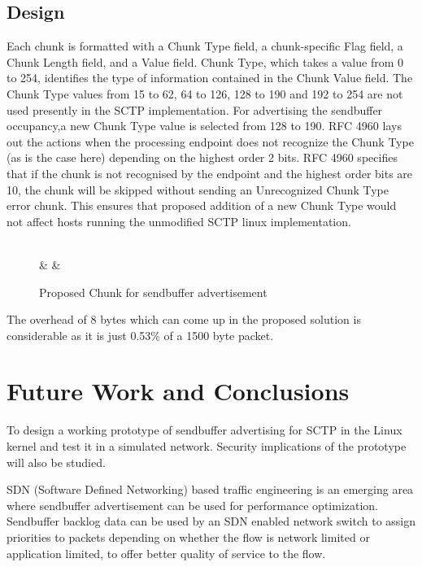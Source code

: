 \documentclass[a4paper,11pt]{article}
\begin{document}
\subsection{Design}
Each chunk is formatted with a Chunk Type field, a chunk-specific Flag field,
a Chunk Length field, and a Value field. Chunk Type, which takes a value
from 0 to 254, identifies the type of information contained in the Chunk
Value field. The Chunk Type values from 15 to 62, 64 to 126, 128 to 190 and
192 to 254 are not used presently in the SCTP implementation.
For advertising the sendbuffer occupancy,a new Chunk Type value is selected
from 128 to 190. RFC 4960 \cite{rfc4960} lays out the actions when
the processing endpoint does not recognize the Chunk Type (as is
the case here) depending on the highest order 2 bits. RFC 4960 \cite{rfc4960}
specifies that if the chunk is not recognised by the endpoint and the
highest order bits are 10, the chunk will be skipped without sending
an Unrecognized Chunk Type error chunk. This ensures that proposed
addition of a new Chunk Type would not affect hosts running the
unmodified SCTP linux implementation.

\begin{figure}[h]
	\centering
	\begin{bytefield}[bitwidth=1.1em]{32}
	\\
	 &  & \\
	\end{bytefield}
	\caption{Proposed Chunk for sendbuffer advertisement}
\end{figure}

The overhead of 8 bytes which can come up in the proposed solution
is considerable as it is just 0.53\% of a 1500 byte packet.


\section{Future Work and Conclusions}
To design a working prototype of sendbuffer advertising for SCTP in the Linux
kernel and test it in a simulated network. Security implications of the
prototype will also be studied.


SDN (Software Defined Networking) based traffic engineering
is an emerging area where
sendbuffer advertisement can be used for
performance optimization. Sendbuffer backlog data can be used by
an SDN enabled network switch to assign priorities to packets
depending on whether the flow is network limited or
application limited, to offer better quality of service to the flow.
\end{document}
